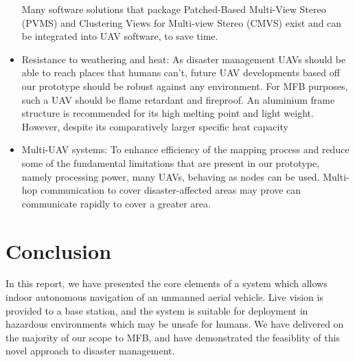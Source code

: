 \documentclass[capstone_report.tex]{subfiles}
\begin{document}
\begin{itemize}
Many software solutions that package Patched-Based Multi-View Stereo (PVMS) and Clustering Views for Multi-view Stereo (CMVS) exist and can be integrated into UAV software, to save time.
\item Resistance to weathering and heat: As disaster management UAVs should be able to reach places that humans can’t, future UAV developments based off our prototype should be robust against any environment. For MFB purposes, such a UAV should be flame retardant and fireproof. An aluminium frame structure is recommended for its high melting point and light weight. However, despite its comparatively larger specific heat capacity
\item Multi-UAV systems: To enhance efficiency of the mapping process and reduce some of the fundamental limitations that are present in our prototype, namely processing power, many UAVs, behaving as nodes can be used. Multi-hop communication to cover disaster-affected areas may prove  can communicate rapidly to cover a greater area.
\end{itemize}

\section{Conclusion}
In this report, we have presented the core elements of a system which allows indoor autonomous navigation of an unmanned aerial vehicle. Live vision is provided to a base station, and the system is suitable for deployment in hazardous environments which may be unsafe for humans. We have delivered on the majority of our scope to MFB, and have demonstrated the feasiblity of this novel approach to disaster management.
\end{document}
